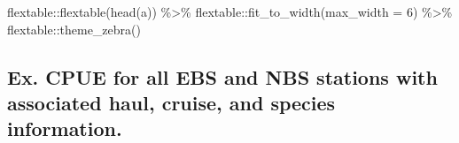 \documentclass[
  letterpaper,
  oneside,
  open=any]{scrbook}
\newenvironment{Shaded}{\begin{snugshade}}{\end{snugshade}}
\newcommand{\AttributeTok}[1]{\textcolor[rgb]{0.40,0.45,0.13}{#1}}
\newcommand{\DecValTok}[1]{\textcolor[rgb]{0.68,0.00,0.00}{#1}}
\newcommand{\FunctionTok}[1]{\textcolor[rgb]{0.28,0.35,0.67}{#1}}
\newcommand{\NormalTok}[1]{\textcolor[rgb]{0.00,0.23,0.31}{#1}}
\newcommand{\SpecialCharTok}[1]{\textcolor[rgb]{0.37,0.37,0.37}{#1}}
\begin{document}
\begin{Shaded}
\begin{Highlighting}[]
\NormalTok{flextable}\SpecialCharTok{::}\FunctionTok{flextable}\NormalTok{(}\FunctionTok{head}\NormalTok{(a)) }\SpecialCharTok{\%\textgreater{}\%} 
\NormalTok{  flextable}\SpecialCharTok{::}\FunctionTok{fit\_to\_width}\NormalTok{(}\AttributeTok{max\_width =} \DecValTok{6}\NormalTok{) }\SpecialCharTok{\%\textgreater{}\%} 
\NormalTok{  flextable}\SpecialCharTok{::}\FunctionTok{theme\_zebra}\NormalTok{()}
\end{Highlighting}
\end{Shaded}

\subsection{Ex. CPUE for all EBS and NBS stations with associated haul,
cruise, and species
information.}\label{ex.-cpue-for-all-ebs-and-nbs-stations-with-associated-haul-cruise-and-species-information.}
\end{document}
